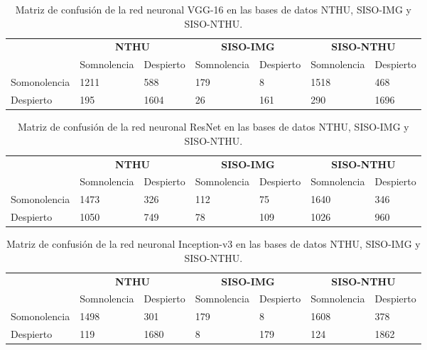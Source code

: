 \documentclass{article}
\begin{document}
	\begin{table}[H]
		\centering		
		\caption{Matriz de confusión de la red neuronal VGG-16 en las bases de datos NTHU, SISO-IMG y SISO-NTHU.}
		\label{tab:comp2}
		\begin{tabular}{ p{1.9cm} p{2cm} p{1.6cm} p{1.9cm} p{1.6cm} p{1.9cm} p{1.6cm}}
			\hline 
			& \multicolumn{2}{c}{\textbf{NTHU}} & \multicolumn{2}{c}{\textbf{SISO-IMG}} &  \multicolumn{2}{c}{\textbf{SISO-NTHU}} \\
			& Somnolencia & Despierto & Somnolencia & Despierto & Somnolencia & Despierto  \\
			\hline 
			Somonolencia & 1211 & 588 		& 179 & 8 		& 1518 & 468 \\
			Despierto & 195 & 1604 	& 26 & 161  	    & 290 & 1696	\\	
			\hline 
		\end{tabular}
	\end{table}

\begin{table}[H]
	\centering		
	\caption{Matriz de confusión de la red neuronal ResNet en las bases de datos NTHU, SISO-IMG y SISO-NTHU.}
	\label{tab:comp3}
	\begin{tabular}{ p{1.9cm} p{2cm} p{1.6cm} p{1.9cm} p{1.6cm} p{1.9cm} p{1.6cm}}
		\hline 
		& \multicolumn{2}{c}{\textbf{NTHU}} & \multicolumn{2}{c}{\textbf{SISO-IMG}} &  \multicolumn{2}{c}{\textbf{SISO-NTHU}} \\
		& Somnolencia & Despierto & Somnolencia & Despierto & Somnolencia & Despierto  \\
		\hline 
		Somonolencia & 1473 & 326 		& 112 & 75 		& 1640 & 346 \\
		Despierto & 1050 & 749		 	& 78 & 109 	    & 1026 & 960	\\	
		\hline 
	\end{tabular}
\end{table}

\begin{table}[H]
	\centering		
	\caption{Matriz de confusión de la red neuronal Inception-v3 en las bases de datos NTHU, SISO-IMG y SISO-NTHU.}
	\label{tab:comp4}
	\begin{tabular}{ p{1.9cm} p{2cm} p{1.6cm} p{1.9cm} p{1.6cm} p{1.9cm} p{1.6cm}}
		\hline 
		& \multicolumn{2}{c}{\textbf{NTHU}} & \multicolumn{2}{c}{\textbf{SISO-IMG}} &  \multicolumn{2}{c}{\textbf{SISO-NTHU}} \\
		& Somnolencia & Despierto & Somnolencia & Despierto & Somnolencia & Despierto  \\
		\hline 
		Somonolencia & 1498 & 301 		& 179 & 8 		& 1608 & 378 \\
		Despierto & 119 & 1680 	& 8 & 179  	    & 124 & 1862	\\	
		\hline 
	\end{tabular}
\end{table}
\end{document}
